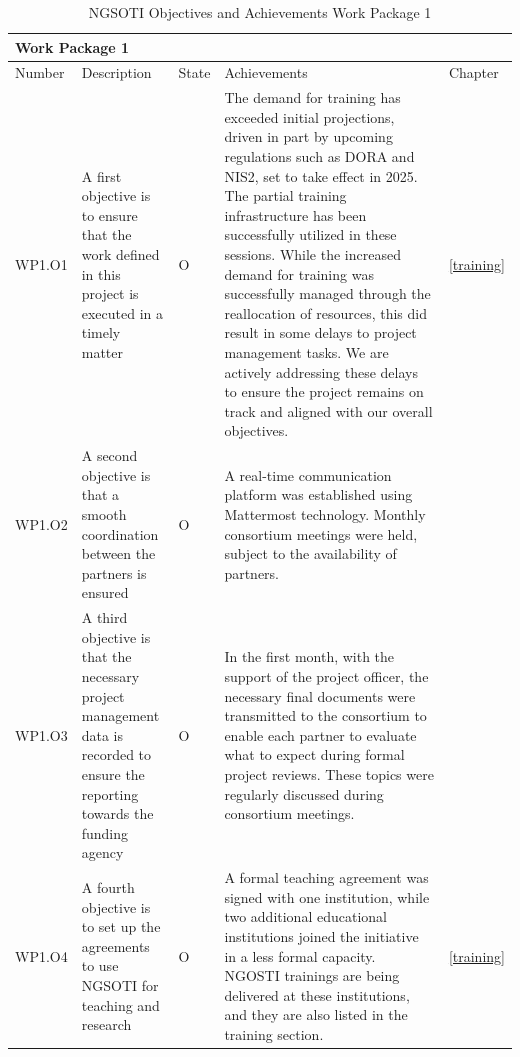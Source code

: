 \begin{table}[h]
\centering

\begin{tabular}{ |p{0.07\linewidth}  |p{0.2\linewidth}|        p{0.04\linewidth}|    p{0.62\linewidth}|  p{0.07\linewidth}|}\hline
\multicolumn{5}{|p{0.97\linewidth}|}{Work Package 1} \\
\hline
                  Number             & Description & State & Achievements & Chapter \\
\hline
WP1.O1 &
A first objective is to ensure that the work defined in this project is executed in a timely matter & O &

The demand for training has exceeded initial projections, driven in part by
upcoming regulations such as DORA and NIS2, set to take effect in 2025.
The partial training infrastructure has been successfully
utilized in these sessions. While the increased demand for training was
successfully managed through the reallocation of resources, this did result
in some delays to project management tasks. We are actively addressing these
delays to ensure the project remains on track and aligned with our overall
objectives.
&
\ref{training}
 \\
\hline
WP1.O2 &
A second objective is that a smooth coordination between the partners is ensured
&O &
A real-time communication platform was established using Mattermost technology.
Monthly consortium meetings were held, subject to the availability of partners.
&
\\

\hline

WP1.O3 &
A third objective is that the necessary project management data is recorded
to ensure the reporting towards the funding
agency
& O &
In the first month, with the support of the project officer, the necessary
final documents were transmitted to the consortium to enable each partner to
evaluate what to expect during formal project reviews.
These topics were regularly discussed during consortium meetings.
&

\\

\hline

WP1.O4 &
A fourth objective is to set up the agreements to use NGSOTI for teaching
and research
& O &
A formal teaching agreement was signed with one institution, while two additional educational institutions joined the initiative in a less formal capacity. NGOSTI trainings are being delivered at these institutions, and they are also listed in the training section.
&
\ref{training}
\\

\hline
\end{tabular}
\caption{NGSOTI Objectives and Achievements Work Package 1}
\label{oa1}
\end{table}



